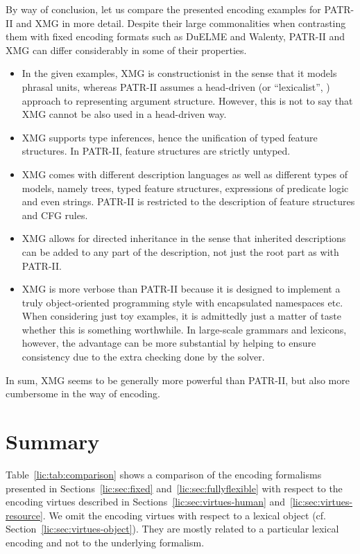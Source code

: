 \documentclass[output=paper
,modfonts
,nonflat
,biblatexbackend=biber
]{langsci/langscibook}
\begin{document}
By way of conclusion, let us compare the presented encoding examples for PA\-TR-II and XMG in more detail. Despite their large  commonalities when contrasting them with fixed encoding formats such as DuELME and Walenty, PATR-II and XMG can differ considerably in some of their properties.
\begin{itemize}
\item In the given examples, XMG is constructionist in the sense that it models phrasal units, whereas PATR-II assumes a head-driven (or ``lexicalist'', \citealt{mueller:wechsler:14}) approach to representing argument structure. However, this is not to say that XMG cannot be also used in a head-driven way. 
\item XMG supports type inferences, hence the unification of typed feature structures. In PATR-II, feature structures are strictly untyped.
\item XMG comes with different description languages as well as different types of models, namely trees, typed feature structures, expressions of predicate logic and even strings. PATR-II is restricted to the description of feature structures and CFG rules.   
\item XMG allows for directed inheritance in the sense that inherited descriptions can be added to any part of the description, not just the root part as with PATR-II.
\item XMG is more verbose than PATR-II because it is designed to implement a truly object-oriented programming style with encapsulated namespaces etc. When considering just toy examples, it is admittedly just a matter of taste whether this is something worthwhile. In large-scale grammars and lexicons, however, the advantage can be more substantial by helping to ensure consistency due to the extra checking done by the solver.
\end{itemize}
In sum, XMG seems to be generally more powerful than PATR-II, but also more cumbersome in the way of encoding. 


\section{Summary}
%
\label{lic:sec:summary}

Table~\ref{lic:tab:comparison} shows a comparison of the encoding formalisms presented in Sections~\ref{lic:sec:fixed} and~\ref{lic:sec:fullyflexible} with respect to the encoding virtues described in Sections~\ref{lic:sec:virtues-human} and~\ref{lic:sec:virtues-resource}. We omit the encoding virtues with respect to a lexical object (cf. Section~\ref{lic:sec:virtues-object}). They are mostly related to a particular lexical encoding and not to the underlying formalism.
\end{document}
